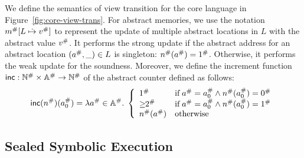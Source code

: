 We define the semantics of view transition for the core language in
Figure~\ref{fig:core-view-trans}.  For abstract memories, we use the notation
${m}^{\#}[L \;\dot{\mapsto}\; {v}^{\#}]$ to represent the update of multiple abstract
locations in $L$ with the abstract value ${v}^{\#}$.  It performs the strong
update if the abstract address for an abstract location $({a}^{\#}, \_) \in L$
is singleton: ${n}^{\#}({a}^{\#}) = {1}^{\#}$.  Otherwise, it performs the weak
update for the soundness.  Moreover, we define the increment function $\textsf{inc}:
{\mathbb{N}}^{\#} \times {\mathbb{A}}^{\#} \rightarrow {\mathbb{N}}^{\#}$ of the abstract counter
defined as follows:
\[
  \textsf{inc}({n}^{\#})({a}^{\#}_0) = \lambda {a}^{\#} \in {\mathbb{A}}^{\#}. \; \left\{
    \begin{array}{ll}
      {1}^{\#} & \text{if} \; {a}^{\#} = {a}^{\#}_0 \wedge
      {n}^{\#}({a}^{\#}_0) = {0}^{\#}\\
      {\geq\!\!2}^{\#} & \text{if} \; {a}^{\#} = {a}^{\#}_0 \wedge
      {n}^{\#}({a}^{\#}_0) = {1}^{\#}\\
      {n}^{\#}({a}^{\#}) & \text{otherwise}
    \end{array}
  \right.
\]


\subsection{Sealed Symbolic Execution}

